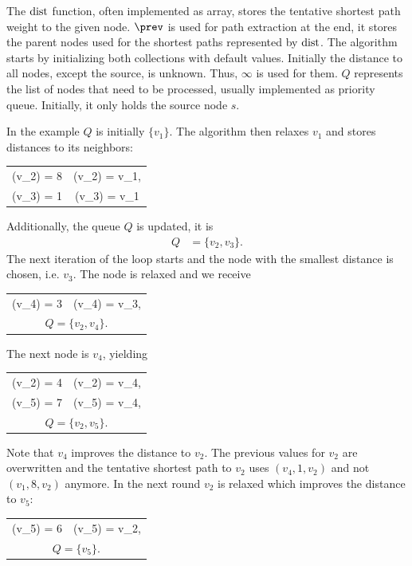 	The $\operatorname{dist}$ function, often implemented as array, stores the tentative shortest path weight to the given node.
	$\prev$ is used for path extraction at the end, it stores the parent nodes used for the shortest paths represented by $\operatorname{dist}$.
	The algorithm starts by initializing both collections with default values. Initially the distance to all nodes, except the source, is unknown.
	Thus, $\infty$ is used for them. $Q$ represents the list of nodes that need to be processed, usually implemented as priority queue.
	Initially, it only holds the source node $s$.
	
	In the example $Q$ is initially $\{v_1\}$. The algorithm then relaxes $v_1$ and stores distances to its neighbors:
	\begin{center}
		\begin{tabular}{CC}
			\dist(v_2) = 8	&\prev(v_2) = v_1,\\
			\dist(v_3) = 1	&\prev(v_3) = v_1
		\end{tabular}
	\end{center}
	Additionally, the queue $Q$ is updated, it is
	\begin{align*}
		Q	&= \{v_2, v_3\}.
	\end{align*}
	The next iteration of the loop starts and the node with the smallest distance is chosen, i.e. $v_3$. The node is relaxed and we receive
	\begin{center}
		\begin{tabular}{CC}
			\dist(v_4) = 3	&\prev(v_4) = v_3,\\
			\multicolumn{2}{c}{$Q = \{v_2, v_4\}.$}
		\end{tabular}
	\end{center}
	The next node is $v_4$, yielding
	\begin{center}
		\begin{tabular}{CC}
			\dist(v_2) = 4	&\prev(v_2) = v_4,\\
			\dist(v_5) = 7	&\prev(v_5) = v_4,\\
			\multicolumn{2}{c}{$Q = \{v_2, v_5\}.$}
		\end{tabular}
	\end{center}
	Note that $v_4$ improves the distance to $v_2$. The previous values for $v_2$ are overwritten and the
	tentative shortest path to $v_2$ uses $(v_4, 1, v_2)$ and not $(v_1, 8, v_2)$ anymore.
	In the next round $v_2$ is relaxed which improves the distance to $v_5$:
	\begin{center}
		\begin{tabular}{CC}
			\dist(v_5) = 6	&\prev(v_5) = v_2,\\
			\multicolumn{2}{c}{$Q = \{v_5\}.$}
		\end{tabular}
	\end{center}
